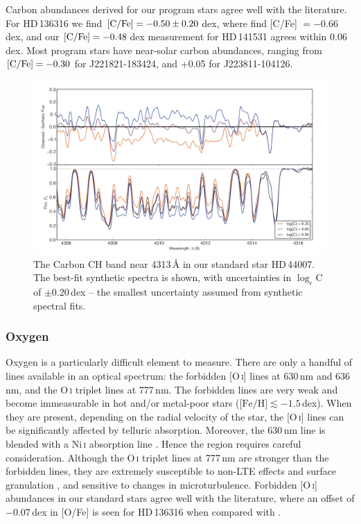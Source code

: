 \documentclass{emulateapj}
\begin{document}
Carbon abundances derived for our program stars agree well with the literature. For HD\,136316 we find {${\rm [C/Fe]} = -0.50 \pm 0.20$}\,dex, where \citet{gratton;et-al_2000} find {[C/Fe] $= -0.66$\,dex}, and our ${{\rm [C/Fe]} = -0.48}$\,dex measurement for HD\,141531 agrees within 0.06\,dex. Most program stars have near-solar carbon abundances, ranging from ${{\rm [C/Fe]} = -0.30}$ for {J221821-183424}, and +0.05 for {J223811-104126}.

\begin{figure}[h!]
	\includegraphics[width=\columnwidth]{./figures/HD44007.pdf}
	\caption{The Carbon CH band near 4313\,{\AA} in our standard star HD\,44007. The best-fit synthetic spectra is shown, with uncertainties in $\log_{\epsilon}$C of $\pm0.20$\,dex -- the smallest uncertainty assumed from synthetic spectral fits.}
	\label{fig:carbon}
\end{figure}


\subsubsection{Oxygen}
\label{sec:oxygen-abundances}
Oxygen is a particularly difficult element to measure. There are only a handful of lines available in an optical spectrum: the forbidden {[O\,\textsc{i}]} lines at 630\,nm and 636\,nm, and the O\,\textsc{i} triplet lines at 777\,nm. The forbidden lines are very weak and become immeasurable in hot and/or metal-poor stars (${\mbox{[Fe/H]} \lesssim -1.5}$\,dex). When they are present, depending on the radial velocity of the star, the {[O\,\textsc{i}]} lines can be significantly affected by telluric absorption. Moreover, the 630\,nm line is blended with a Ni\,\textsc{i} absorption line \citep{allende-prieto;et-al_2001}. Hence the region requires careful consideration. Although the O\,\textsc{i} triplet lines at 777\,nm are stronger than the forbidden lines, they are extremely susceptible to non-LTE effects and surface granulation \citep{asplund;perez_2001}, and sensitive to changes in microturbulence. Forbidden {[O\,\textsc{i}]} abundances in our standard stars agree well with the literature, where an offset of $-0.07$\,dex in [O/Fe] is seen for HD\,136316 when compared with \citet{gratton;et-al_2000}. 
\end{document}
